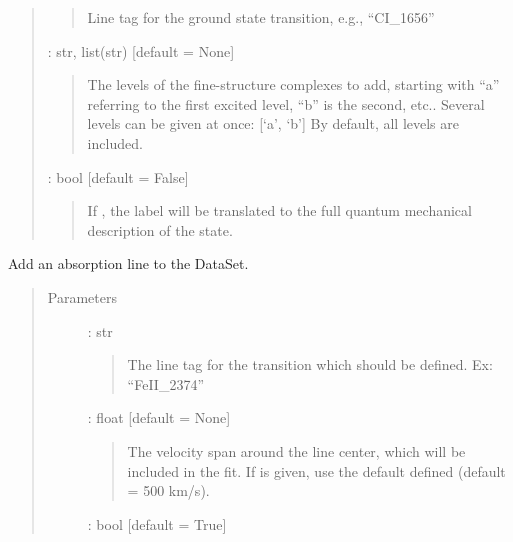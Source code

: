 \documentclass[letterpaper,10pt,english]{sphinxmanual}
\begin{document}
\begin{fulllineitems}
\begin{fulllineitems}
\begin{quote}
\begin{description}
\begin{quote}
Line tag for the ground state transition, e.g., “CI\_1656”
\end{quote}

 : str, list(str)    {[}default = None{]}
\begin{quote}

The levels of the fine-structure complexes to add, starting with “a” referring
to the first excited level, “b” is the second, etc..
Several levels can be given at once: {[}‘a’, ‘b’{]}
By default, all levels are included.
\end{quote}

 : bool   {[}default = False{]}
\begin{quote}

If , the label will be translated to the full quantum mechanical description
of the state.
\end{quote}

\end{description}\end{quote}

\end{fulllineitems}


\begin{fulllineitems}
\label{\detokenize{api:VoigtFit.DataSet.add_line}}
Add an absorption line to the DataSet.
\begin{quote}\begin{description}
\item[{Parameters}] \leavevmode
{} : str
\begin{quote}

The line tag for the transition which should be defined.
Ex: “FeII\_2374”
\end{quote}

 : float   {[}default = None{]}
\begin{quote}

The velocity span around the line center, which will be included
in the fit. If  is given, use the default 
defined (default = 500 km/s).
\end{quote}

 : bool   {[}default = True{]}
\begin{quote}


\end{quote}
\end{description}
\end{quote}
\end{fulllineitems}
\end{fulllineitems}
\end{document}
